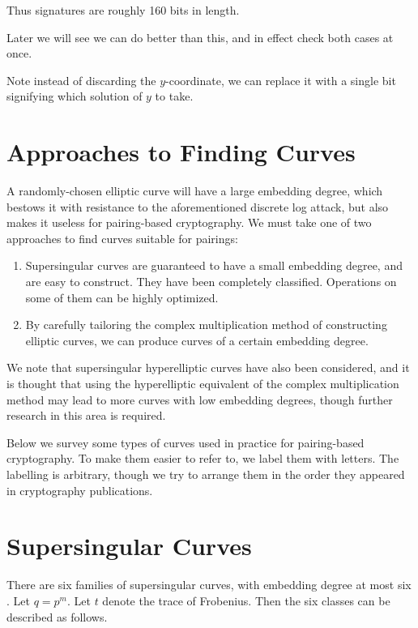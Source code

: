 Thus signatures are roughly 160 bits in length.

Later we will see we can do better than this, and in effect check both
cases at once.

Note instead of discarding the $y$-coordinate, we can
replace it with a single bit signifying which solution of $y$ to take.

\section {Approaches to Finding Curves}

A randomly-chosen elliptic curve will have a large embedding
degree, which bestows it with resistance to the aforementioned discrete log
attack, but also makes it useless for pairing-based cryptography.
We must take one of two approaches to find curves suitable for pairings:

\begin{enumerate}
\item
Supersingular curves are guaranteed to have a small embedding degree,
and are easy to construct. They have been completely classified. Operations
on some of them can be highly optimized.
\item
By carefully tailoring the complex multiplication method of constructing
elliptic curves, we can produce curves of a certain embedding degree. 
\end{enumerate}

We note that supersingular hyperelliptic curves have also been considered,
and it is thought that using the hyperelliptic equivalent of the
complex multiplication method may lead to more curves with low
embedding degrees, though further research in this area is required.

Below we survey some types of curves used in practice for pairing-based
cryptography. To make them easier to refer to, we label them with letters.
The labelling is arbitrary, though we try to arrange them in the order
they appeared in cryptography publications.

\section {Supersingular Curves}

There are six families of supersingular curves, with embedding degree at
most six \cite{mov}. Let $q=p^m$. Let $t$ denote the trace of Frobenius.
Then the six classes can be described as follows.

